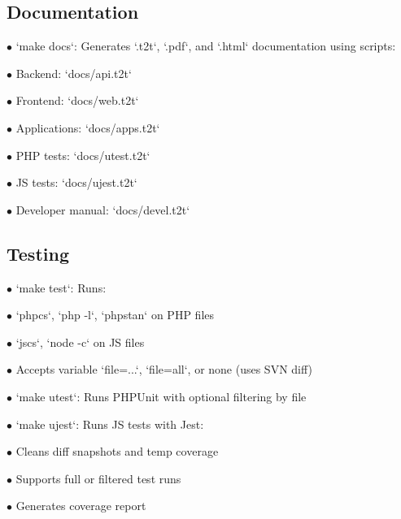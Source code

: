 \documentclass[a4paper]{article}
\begin{document}
\hypertarget{toc23}{}
\subsection{Documentation}

\begin{compactitem}
\item[\color{myblue}$\bullet$] `make docs`: Generates `.t2t`, `.pdf`, and `.html` documentation using scripts:
  \begin{compactitem}
  \item[\color{myblue}$\bullet$] Backend: `docs/api.t2t`
  \item[\color{myblue}$\bullet$] Frontend: `docs/web.t2t`
  \item[\color{myblue}$\bullet$] Applications: `docs/apps.t2t`
  \item[\color{myblue}$\bullet$] PHP tests: `docs/utest.t2t`
  \item[\color{myblue}$\bullet$] JS tests: `docs/ujest.t2t`
  \item[\color{myblue}$\bullet$] Developer manual: `docs/devel.t2t`
  \end{compactitem}
\end{compactitem}

\hypertarget{toc24}{}
\subsection{Testing}

\begin{compactitem}
\item[\color{myblue}$\bullet$] `make test`: Runs:
  \begin{compactitem}
  \item[\color{myblue}$\bullet$] `phpcs`, `php -l`, `phpstan` on PHP files
  \item[\color{myblue}$\bullet$] `jscs`, `node -c` on JS files
  \item[\color{myblue}$\bullet$] Accepts variable `file=...`, `file=all`, or none (uses SVN diff)
  \end{compactitem}
\item[\color{myblue}$\bullet$] `make utest`: Runs PHPUnit with optional filtering by file
\item[\color{myblue}$\bullet$] `make ujest`: Runs JS tests with Jest:
  \begin{compactitem}
  \item[\color{myblue}$\bullet$] Cleans diff snapshots and temp coverage
  \item[\color{myblue}$\bullet$] Supports full or filtered test runs
  \item[\color{myblue}$\bullet$] Generates coverage report
  \end{compactitem}
\end{compactitem}
\end{document}
